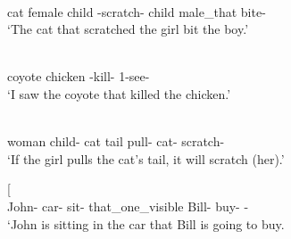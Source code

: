 \enlargethispage{2\baselineskip}
\begin{exe}\ex\label{YavDep}
\begin{xlist}
\ex\gll  {\rm[}   \textipa{k-ttmo:-c}{\rm]}   \\
cat female child \relativ{}-scratch-\nom{} child male\_that bite-\compl{}\\
\glt `The cat that scratched the girl bit the boy.'%

\ex\gll  {\rm[}  \textipa{k-ne:h-a}{\rm]} \\
coyote chicken \relativ{}-kill-\tns{} 1-see-\compl{}\\
\glt `I saw the coyote that killed the chicken.' %

\ex\gll  {\rm[}    \textipa{syo:m-kiTo}{\rm]}  \\
woman child-\nom{} cat tail pull-\cond{} cat-\nom{} scratch-\fut{}\\
\glt `If the girl pulls the cat's tail, it will scratch (her).'


\ex\gll{}   {\rm[}   \textipa{no:-km}{\rm]}\\
John-\nom{} car-\ines{} sit-\allo{} that\_one\_visible Bill-\nom{} buy-\ego{} \fut{}-\icml{}\\
\glt `John is sitting in the car that Bill is going to buy.

\end{xlist}
\end{exe}

